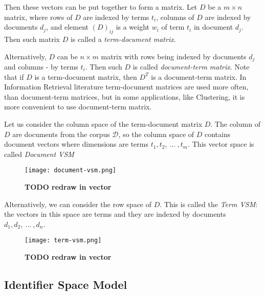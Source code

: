 Then these vectors can be put together to form a matrix. Let $D$ be
a $m \times n$ matrix, where rows of $D$ are indexed by terms $t_i$,
columns of $D$ are indexed by documents $d_j$, and element $(D)_{ij}$
is a weight $w_i$ of term $t_i$ in document $d_j$. Then
such matrix $D$ is called a \emph{term-document matrix}.

Alternatively, $D$ can be $n \times m$ matrix with rows being indexed
by documents $d_j$ and columns - by terms $t_i$. Then such $D$ is called
\emph{document-term matrix}. Note that if $D$ is a term-document matrix,
then $D^T$ is a document-term matrix. In Information Retrieval
literature term-document matrices are used more often, than
document-term matrices, but in some applications, like Clustering,
it is more convenient to use document-term matrix.


Let us consider the column space of the term-document matrix $D$.
The column of $D$ are documents from the corpus $\mathcal D$,
so the column space of $D$ contains document vectors where
dimensions are terms $t_1,  t_2, \ ... \ , t_m$. This vector space is
called \emph{Document VSM}


\begin{figure}[h]
\centering\texttt{[image: document-vsm.png]}
\caption{\textbf{TODO redraw in vector}}
\label{fig:document-vsm}
\end{figure}


Alternatively, we can consider the row space of $D$. This is
called the \emph{Term VSM}: the vectors in this space are terms
and they are indexed by documents $d_1, d_2,  \ ... \ , d_n$.


\begin{figure}[h]
\centering\texttt{[image: term-vsm.png]}
\caption{\textbf{TODO redraw in vector}}
\label{fig:term-vsm}
\end{figure}





\subsection{Identifier Space Model} \label{sec:ism}

